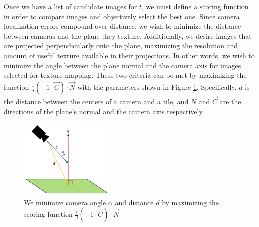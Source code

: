 \documentclass[10pt,twocolumn,letterpaper]{article}
\begin{document}
Once we have a list of candidate images for $t$, we must define a
scoring function in order to compare images and objectively select the
best one. Since camera localization errors compound over distance, we
wish to minimize the distance between cameras and the plane they
texture. Additionally, we desire images that are projected
perpendicularly onto the plane, maximizing the resolution and amount
of useful texture available in their projections. In other words, we
wish to minimize the angle between the plane normal and the camera
axis for images selected for texture mapping. These two criteria can
be met by maximizing the function $\frac{1}{d} (-1 \cdot \vec{C})
\cdot \vec{N}$ with the parameters shown in Figure
\ref{fig:scoringFunction}. Specifically, $d$ is the distance between
the centers of a camera and a tile, and $\vec{N}$ and $\vec{C}$ are
the directions of the plane's normal and the camera axis respectively.

\begin{figure}
  \centering
  \includegraphics[height=1.5in]{scoringFunction.pdf}
  \caption{We minimize camera angle $\alpha$ and distance $d$ by maximizing the scoring function $\frac{1}{d} (-1 \cdot \vec{C})
\cdot \vec{N}$}
  \label{fig:scoringFunction}
\end{figure}
\end{document}

